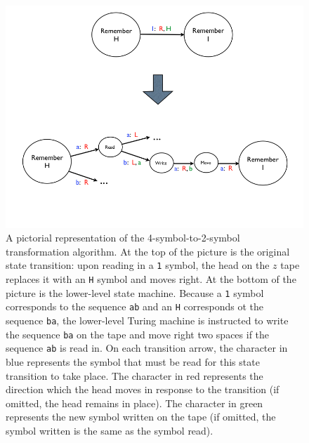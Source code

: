 \begin{figure} 
\begin{center} 
\includegraphics[scale=0.4]{figs/goldbach6.png} 
\caption{A pictorial representation of the 4-symbol-to-2-symbol transformation algorithm. At the top of the picture is the original state transition: upon reading in a \texttt{1} symbol, the head on the $z$ tape replaces it with an \texttt{H} symbol and moves right. At the bottom of the picture is the lower-level state machine. Because a \texttt{1} symbol corresponds to the sequence \texttt{ab} and an \texttt{H} corresponds ot the sequence \texttt{ba}, the lower-level Turing machine is instructed to write the sequence \texttt{ba} on the tape and move right two spaces if the sequence \texttt{ab} is read in. On each transition arrow, the character in blue represents the symbol that must be read for this state transition to take place. The character in red represents the direction which the head moves in response to the transition (if omitted, the head remains in place). The character in green represents the new symbol written on the tape (if omitted, the symbol written is the same as the symbol read). \label{fig:goldbach6}}
\end{center} 
\end{figure}

